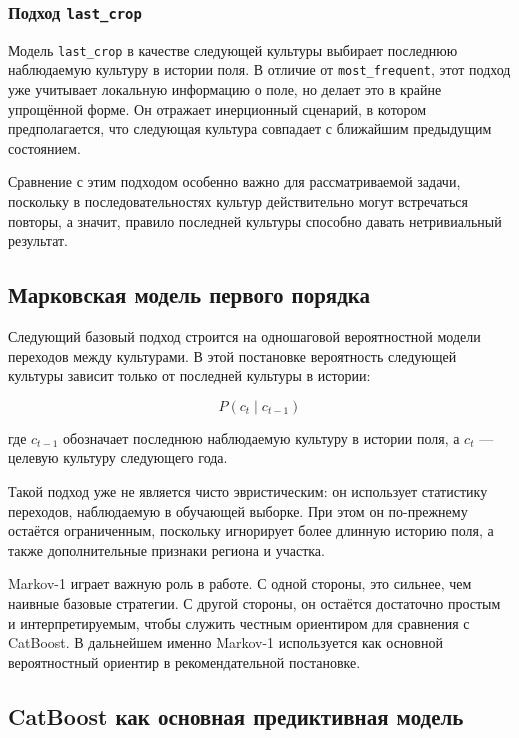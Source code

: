 \subsubsection{\texorpdfstring{Подход \texttt{last\_crop}}{Подход last\_crop}}

Модель \texttt{last\_crop} в качестве следующей культуры выбирает последнюю наблюдаемую культуру в истории поля. В
отличие от \texttt{most\_frequent}, этот подход уже учитывает локальную информацию о поле, но делает это в крайне
упрощённой форме. Он отражает инерционный сценарий, в котором предполагается, что следующая культура совпадает с
ближайшим предыдущим состоянием.

Сравнение с этим подходом особенно важно для рассматриваемой задачи, поскольку в последовательностях культур
действительно могут встречаться повторы, а значит, правило последней культуры способно давать нетривиальный результат.

\subsection{Марковская модель первого порядка}

Следующий базовый подход строится на одношаговой вероятностной модели переходов между культурами. В этой постановке
вероятность следующей культуры зависит только от последней культуры в истории:

\[
P(c_t \mid c_{t-1})
\]

где \(c_{t-1}\) обозначает последнюю наблюдаемую культуру в истории поля, а \(c_t\) --- целевую культуру следующего года.

Такой подход уже не является чисто эвристическим: он использует статистику переходов, наблюдаемую в обучающей выборке.
При этом он по-прежнему остаётся ограниченным, поскольку игнорирует более длинную историю поля, а также дополнительные
признаки региона и участка.

Markov-1 играет важную роль в работе. С одной стороны, это сильнее, чем наивные базовые стратегии. С другой стороны,
он остаётся достаточно простым и интерпретируемым, чтобы служить честным ориентиром для сравнения с CatBoost. В
дальнейшем именно Markov-1 используется как основной вероятностный ориентир в рекомендательной постановке.

\subsection{CatBoost как основная предиктивная модель}

